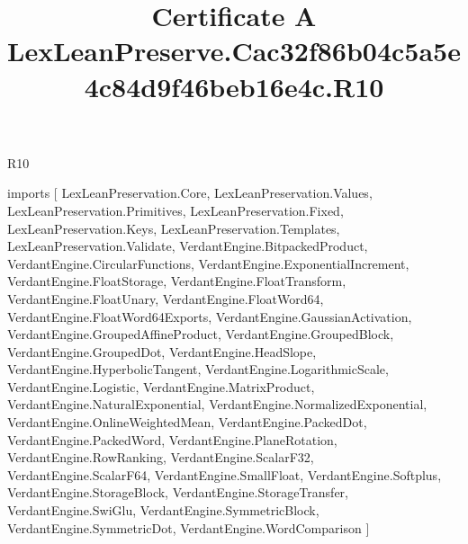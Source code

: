 \begin{lexlean}{R10}
\title{Certificate A LexLeanPreserve.Cac32f86b04c5a5e4c84d9f46beb16e4c.R10}
\begin{coremodule}
imports [
  LexLeanPreservation.Core,
  LexLeanPreservation.Values,
  LexLeanPreservation.Primitives,
  LexLeanPreservation.Fixed,
  LexLeanPreservation.Keys,
  LexLeanPreservation.Templates,
  LexLeanPreservation.Validate,
  VerdantEngine.BitpackedProduct,
  VerdantEngine.CircularFunctions,
  VerdantEngine.ExponentialIncrement,
  VerdantEngine.FloatStorage,
  VerdantEngine.FloatTransform,
  VerdantEngine.FloatUnary,
  VerdantEngine.FloatWord64,
  VerdantEngine.FloatWord64Exports,
  VerdantEngine.GaussianActivation,
  VerdantEngine.GroupedAffineProduct,
  VerdantEngine.GroupedBlock,
  VerdantEngine.GroupedDot,
  VerdantEngine.HeadSlope,
  VerdantEngine.HyperbolicTangent,
  VerdantEngine.LogarithmicScale,
  VerdantEngine.Logistic,
  VerdantEngine.MatrixProduct,
  VerdantEngine.NaturalExponential,
  VerdantEngine.NormalizedExponential,
  VerdantEngine.OnlineWeightedMean,
  VerdantEngine.PackedDot,
  VerdantEngine.PackedWord,
  VerdantEngine.PlaneRotation,
  VerdantEngine.RowRanking,
  VerdantEngine.ScalarF32,
  VerdantEngine.ScalarF64,
  VerdantEngine.SmallFloat,
  VerdantEngine.Softplus,
  VerdantEngine.StorageBlock,
  VerdantEngine.StorageTransfer,
  VerdantEngine.SwiGlu,
  VerdantEngine.SymmetricBlock,
  VerdantEngine.SymmetricDot,
  VerdantEngine.WordComparison
]


\end{coremodule}
\end{lexlean}
